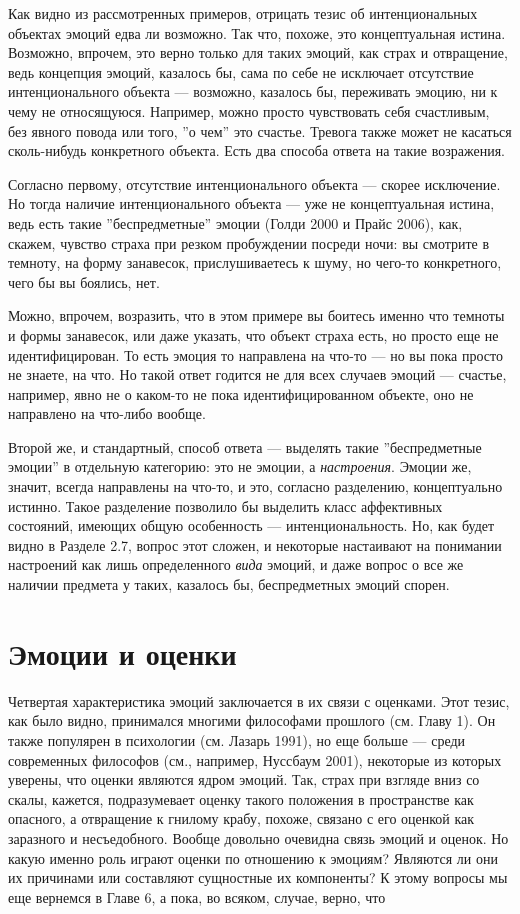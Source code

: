 \documentclass[11pt]{book}
\begin{document}
Как видно из рассмотренных примеров, отрицать тезис об интенциональных объектах эмоций едва ли возможно. Так что, похоже, это концептуальная истина. Возможно, впрочем, это верно только для таких эмоций, как страх и отвращение, ведь концепция эмоций, казалось бы, сама по себе не исключает отсутствие интенционального объекта --- возможно, казалось бы, переживать эмоцию, ни к чему не относящуюся. Например, можно просто чувствовать себя счастливым, без явного повода или того, ''о чем'' это счастье. Тревога также может не касаться сколь-нибудь конкретного объекта. Есть два способа ответа на такие возражения.

Согласно первому, отсутствие интенционального объекта --- скорее исключение. Но тогда наличие интенционального объекта --- уже не концептуальная истина, ведь есть такие ''беспредметные'' эмоции (Голди 2000 и Прайс 2006), как, скажем, чувство страха при резком пробуждении посреди ночи: вы смотрите в темноту, на форму занавесок, прислушиваетесь к шуму, но чего-то конкретного, чего бы вы боялись, нет.

Можно, впрочем, возразить, что в этом примере вы боитесь именно что темноты и формы занавесок, или даже указать, что объект страха есть, но просто еще не идентифицирован. То есть эмоция то направлена на что-то --- но вы пока просто не знаете, на что. Но такой ответ годится не для всех случаев эмоций --- счастье, например, явно не о каком-то не пока идентифицированном объекте, оно не направлено на что-либо вообще.

Второй же, и стандартный, способ ответа --- выделять такие ''беспредметные эмоции'' в отдельную категорию: это не эмоции, а \textit{настроения}. Эмоции же, значит, всегда направлены на что-то, и это, согласно разделению, концептуально истинно. Такое разделение позволило бы выделить класс аффективных состояний, имеющих общую особенность --- интенциональность. Но, как будет видно в Разделе 2.7, вопрос этот сложен, и некоторые настаивают на понимании настроений как лишь определенного \textit{вида} эмоций, и даже вопрос о все же наличии предмета у таких, казалось бы, беспредметных эмоций спорен.

\section{Эмоции и оценки}

Четвертая характеристика эмоций заключается в их связи с оценками. Этот тезис, как было видно, принимался многими философами прошлого (см. Главу 1). Он также популярен в психологии (см. Лазарь 1991), но еще больше --- среди современных философов (см., например, Нуссбаум 2001), некоторые из которых уверены, что оценки являются ядром эмоций. Так, страх при взгляде вниз со скалы, кажется, подразумевает оценку такого положения в пространстве как опасного, а отвращение к гнилому крабу, похоже, связано с его оценкой как заразного и несъедобного. Вообще довольно очевидна связь эмоций и оценок. Но какую именно роль играют оценки по отношению к эмоциям? Являются ли они их причинами или составляют сущностные их компоненты? К этому вопросы мы еще вернемся в Главе 6, а пока, во всяком, случае, верно, что
\end{document}
